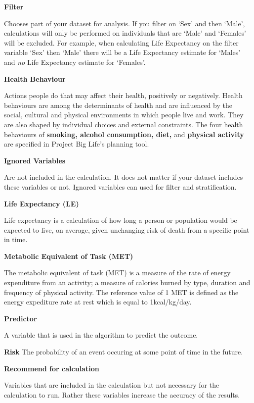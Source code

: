 \documentclass[]{book}
\begin{document}
\textbf{Filter}

Chooses part of your dataset for analysis. If you filter on
`Sex' and then `Male', calculations will only be performed on
individuals that are `Male' and `Females' will be excluded. For example,
when calculating Life Expectancy on the filter variable `Sex' then
`Male' there will be a Life Expectancy estimate for `Males' and
\emph{no} Life Expectancy estimate for `Females'.

\textbf{Health Behaviour}

Actions people do that may affect their health, positively or
negatively. Health behaviours are among the determinants of health and
are influenced by the social, cultural and physical environments in
which people live and work.\citep{StatsCan2010} They are also shaped by
individual choices and external constraints.\citep{StatsCan2010} The
four health behaviours of \textbf{smoking, alcohol consumption, diet,}
and \textbf{physical activity} are specified in Project Big Life's
planning tool.

\textbf{Ignored Variables}

Are not included in the calculation. It does not matter if your dataset
includes these variables or not. Ignored variables can used for filter
and stratification.

\textbf{Life Expectancy (LE)}

Life expectancy is a calculation of how long a person or
population would be expected to live, on average, given unchanging risk
of death from a specific point in time.

\textbf{Metabolic Equivalent of Task (MET)}

The metabolic equivalent of task (MET) is a measure of the rate of
energy expenditure from an activity; a measure of calories burned by
type, duration and frequency of physical activity. The reference value
of 1 MET is defined as the energy expediture rate at rest which is equal
to 1kcal/kg/day.

\textbf{Predictor}

A variable that is used in the algorithm to predict the outcome.

\textbf{Risk} The probability of an event occuring at some point of time
in the future.

\textbf{Recommend for calculation}

Variables that are included in the calculation but not necessary for the
calculation to run. Rather these variables increase the accuracy of the
results.
\end{document}
